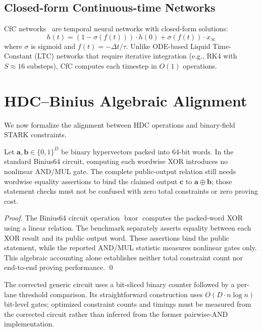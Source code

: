 \documentclass[11pt,twocolumn]{article}
\begin{document}
\subsection{Closed-form Continuous-time Networks}

CfC networks~\cite{hasani2022cfc} are temporal neural networks with closed-form solutions:
$$h(t) = (1 - \sigma(f(t))) \cdot h(0) + \sigma(f(t)) \cdot x_\infty$$
where $\sigma$ is sigmoid and $f(t) = -\Delta t / \tau$. Unlike ODE-based Liquid Time-Constant (LTC) networks that require iterative integration (e.g., RK4 with $S \approx 16$ substeps), CfC computes each timestep in $O(1)$ operations.

\section{HDC--Binius Algebraic Alignment}
\label{sec:alignment}

We now formalize the alignment between HDC operations and binary-field STARK constraints.

\begin{theorem}
Let $\mathbf{a}, \mathbf{b} \in \{0,1\}^D$ be binary hypervectors packed into 64-bit words. In the standard Binius64 circuit, computing each wordwise XOR introduces no nonlinear AND/MUL gate. The complete public-output relation still needs wordwise equality assertions to bind the claimed output $\mathbf{c}$ to $\mathbf{a} \oplus \mathbf{b}$; those statement checks must not be confused with zero total constraints or zero proving cost.
\end{theorem}

\begin{proof}
The Binius64 circuit operation $\operatorname{bxor}$ computes the packed-word XOR using a linear relation. The benchmark separately asserts equality between each XOR result and its public output word. These assertions bind the public statement, while the reported AND/MUL statistic measures nonlinear gates only. This algebraic accounting alone establishes neither total constraint count nor end-to-end proving performance. \qed
\end{proof}

\begin{corollary}
The corrected generic circuit uses a bit-sliced binary counter followed by a per-lane threshold comparison. Its straightforward construction uses $O(D \cdot n \log n)$ bit-level gates; optimized constraint counts and timings must be measured from the corrected circuit rather than inferred from the former pairwise-AND implementation.
\end{corollary}
\end{document}
